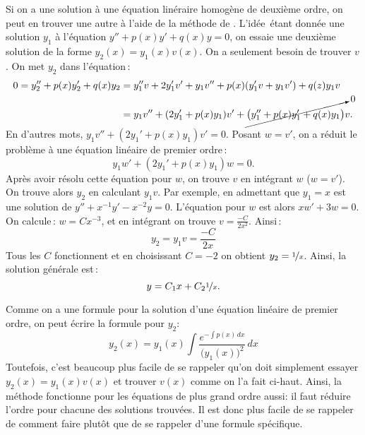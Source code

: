 \medskip

Si on a une solution à une équation linéraire homogène de deuxième ordre, on peut en trouver une autre à l'aide de la méthode de  \emph{}.  L'idée\, étant donnée une solution $y_1$ à l'équation
$y'' + p(x) y' + q(x) y = 0$, on essaie une deuxième solution de la forme $y_2(x) = y_1(x) v(x)$.
On a seulement besoin de trouver $v$.  On met $y_2$ dans l'équation\,:
\begin{equation*}
\begin{split}
0 = 
y_2'' + p(x) y_2' + q(x) y_2 & =
y_1'' v + 2 y_1' v' + y_1 v''
+ p(x) ( y_1' v + y_1 v' )
+ q(z) y_1 v
\\
& =
y_1 v''
+ (2 y_1' + p(x) y_1) v'
+
\cancelto{0}{\bigl( y_1'' + p(x) y_1' + q(x) y_1 \bigr)} v .
\end{split}
\end{equation*}
En d'autres mots, 
$y_1 v'' + (2 y_1' + p(x) y_1) v' = 0$.  Posant $w = v'$, on a réduit le problème à une équation linéaire de premier ordre\,:
\begin{equation*}
y_1 w' + (2 y_1' + p(x) y_1) w = 0.
\end{equation*}
%
Après avoir résolu cette équation pour $w$,
on trouve $v$ en intégrant $w$ ($w=v'$).  On trouve alors $y_2$ en calculant
$y_1 v$.  Par exemple, en admettant que $y_1 = x$ est une solution
de $y''+x^{-1}y'-x^{-2} y=0$.
L'équation pour $w$ est alors
$xw' + 3 w = 0$.  On calcule\,: $w = Cx^{-3}$, et en intégrant on trouve  $v = \frac{-C}{2x^2}$.
Ainsi\,:
\begin{equation*}
y_2 = y_1 v = \frac{-C}{2x}
\end{equation*}
%
Tous les $C$ fonctionnent et en choisissant $C=-2$ on obtient $y_2 = \nicefrac{1}{x}$.  Ainsi, la solution générale est\,:
\begin{equation*}
y = C_1 x + C_2\nicefrac{1}{x}.
\end{equation*}

Comme on a une formule pour la solution d'une équation linéaire de premier ordre, on peut écrire la formule pour $y_2$:
\begin{equation*}
y_2(x) = y_1(x) \int \frac{e^{-\int p(x)\,dx}}{{\bigl(y_1(x)\bigr)}^2} \,dx
\end{equation*}
Toutefois, c'est beaucoup plus facile de se rappeler qu'on doit simplement essayer $y_2(x) =
y_1(x) v(x)$ et trouver $v(x)$ comme on l'a fait ci-haut.  Ainsi, la méthode fonctionne pour les équations de plus grand ordre aussi: il faut réduire l'ordre pour chacune des solutions trouvées. Il est donc plus facile de se rappeler de comment faire plutôt que de se rappeler d'une formule spécifique. 

